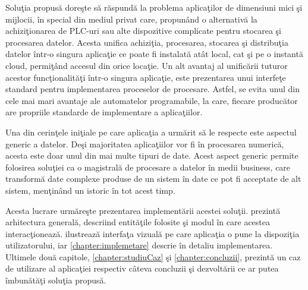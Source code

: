 Soluţia propusă doreşte să răspundă la problema aplicaţilor de dimensiuni mici şi mijlocii, în special din mediul privat care, propunând o alternativă la achiziţionarea de PLC-uri sau alte dispozitive complicate pentru stocarea şi procesarea datelor. Acesta unifica achiziţia, procesarea, stocarea şi distribuţia datelor într-o singura aplicaţie ce poate fi instalată atât local, cat şi pe o instantă cloud, permiţând accesul din orice locaţie. Un alt avantaj al unificării tuturor acestor funcţionalităţi într-o singura aplicaţie, este prezentarea unui interfeţe standard pentru implementarea proceselor de procesare. Astfel, se evita unul din cele mai mari avantaje ale automatelor programabile, la care, fiecare producător are propriile standarde de implementare a aplicaţiilor.

Una din cerinţele iniţiale pe care aplicaţia a urmărit să le respecte este aspectul generic a datelor. Deşi majoritatea aplicaţiilor vor fi în procesarea numerică, acesta este doar unul din mai multe tipuri de date. Acest aspect generic permite folosirea soluţiei ca o magistrală de procesare a datelor în medii business, care transformă date complexe produse de un sistem în date ce pot fi acceptate de alt sistem, menţinând un istoric în tot acest timp.

Acesta lucrare urmăreşte prezentarea implementării acestei soluţii.  prezintă arhitectura generală, descriind entităţile folosite şi modul în care acestea interacţionează.  ilustrează interfaţa vizuală pe care aplicaţia o pune la dispoziţia utilizatorului, iar \cref{chapter:implemetare} descrie în detaliu implementarea. Ultimele două capitole, \ref{chapter:studiuCaz} şi \ref{chapter:concluzii}, prezintă un caz de utilizare al aplicaţiei respectiv câteva concluzii şi dezvoltării ce ar putea îmbunătăţi soluţia propusă.